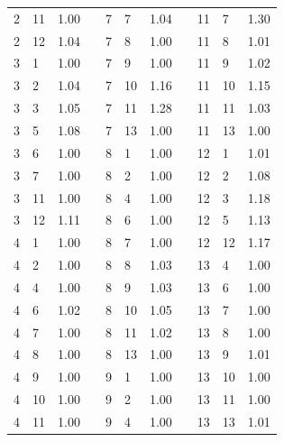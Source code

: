 \begin{table}[h!]
\begin{tabular}{llrp{0.2cm}llrp{0.2cm}llr}
 2 & 11 & 1.00 &  & 7 & 7 & 1.04 & & 11 & 7 & 1.30 \\
 2 & 12 & 1.04 &  & 7 & 8 & 1.00 & & 11 & 8 & 1.01 \\
 3 & 1 & 1.00  & & 7 & 9 & 1.00 &  &11 & 9 & 1.02 \\
 3 & 2 & 1.04  & & 7 & 10 & 1.16 & & 11 & 10 & 1.15 \\
 3 & 3 & 1.05  & & 7 & 11 & 1.28 & & 11 & 11 & 1.03 \\
 3 & 5 & 1.08  & & 7 & 13 & 1.00 & & 11 & 13 & 1.00 \\
 3 & 6 & 1.00  & & 8 & 1 & 1.00 &  &12 & 1 & 1.01 \\
 3 & 7 & 1.00  & & 8 & 2 & 1.00 &  &12 & 2 & 1.08 \\
 3 & 11 & 1.00 &  & 8 & 4 & 1.00 & & 12 & 3 & 1.18 \\
 3 & 12 & 1.11 &  & 8 & 6 & 1.00 & & 12 & 5 & 1.13 \\
 4 & 1 & 1.00  & & 8 & 7 & 1.00 &  &12 & 12 & 1.17 \\
 4 & 2 & 1.00  & & 8 & 8 & 1.03 &  &13 & 4 & 1.00 \\
 4 & 4 & 1.00  & & 8 & 9 & 1.03 &  &13 & 6 & 1.00 \\
 4 & 6 & 1.02  & & 8 & 10 & 1.05 & & 13 & 7 & 1.00 \\
 4 & 7 & 1.00  & & 8 & 11 & 1.02 & & 13 & 8 & 1.00 \\
 4 & 8 & 1.00  & & 8 & 13 & 1.00 & & 13 & 9 & 1.01 \\
 4 & 9 & 1.00  & & 9 & 1 & 1.00 &  &13 & 10 & 1.00 \\
 4 & 10 & 1.00 &  & 9 & 2 & 1.00 & & 13 & 11 & 1.00 \\
 4 & 11 & 1.00 &  & 9 & 4 & 1.00 & & 13 & 13 & 1.01 \\
 \bottomrule
 \end{tabular}
 \label{tab:sens_2_gelman_rubin}
\end{table}


